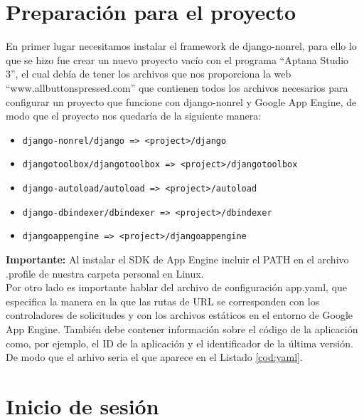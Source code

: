 \section{Preparación para el proyecto}
\label{4:sec3}

En primer lugar necesitamos instalar el framework de django-nonrel, para ello lo que se hizo fue crear un nuevo proyecto vacío con el 
programa ``Aptana Studio 3'', el cual debía de tener los archivos que nos proporciona la web ``www.allbuttonspressed.com'' que contienen 
todos los archivos necesarios para configurar un proyecto que funcione con django-nonrel y Google App Engine, 
de modo que el proyecto nos quedaría de la siguiente manera:

\begin{itemize}
  \item \lstinline!django-nonrel/django => <project>/django!
  \item \lstinline!djangotoolbox/djangotoolbox => <project>/djangotoolbox!
  \item \lstinline!django-autoload/autoload => <project>/autoload!
  \item \lstinline!django-dbindexer/dbindexer => <project>/dbindexer!
  \item \lstinline!djangoappengine => <project>/djangoappengine!
\end{itemize}

\textbf{Importante:} Al instalar el SDK de App Engine incluir el PATH en el archivo .profile de nuestra carpeta personal en Linux.\\

Por otro lado es importante hablar del archivo de configuración app.yaml, que especifica la manera en la que las rutas de URL se corresponden con los 
controladores de solicitudes y con los archivos estáticos en el entorno de Google App Engine. 
También debe contener información sobre el código de la aplicación como, por ejemplo, el ID de la aplicación y el identificador de la última versión.\\

De modo que el arhivo seria el que aparece en el Listado \ref{cod:yaml}.\\



\section{Inicio de sesión}
\label{4:sec4}

